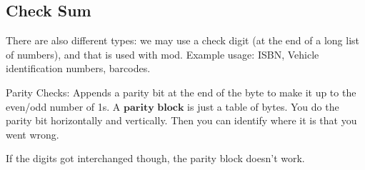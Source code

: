 \documentclass{article}
\theoremstyle{mytheoremstyle}
\theoremstyle{mytheoremstyle}
\theoremstyle{myproblemstyle}
\begin{document}
    \subsection{Check Sum}
    There are also different types: we may use a check digit (at the end of a long list of numbers), and that is used with mod. Example usage: ISBN, Vehicle identification numbers, barcodes.

    \vspace{5pt}

    Parity Checks: Appends a parity bit at the end of the byte to make it up to the even/odd number of 1s. A $\textbf{parity block}$ is just a table of bytes. You do the parity bit horizontally and vertically. Then you can identify where it is that you went wrong. 

    If the digits got interchanged though, the parity block doesn't work.
    
\end{document}
